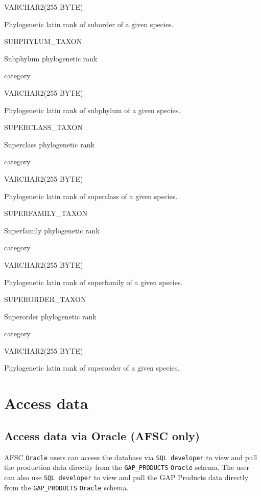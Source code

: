 \documentclass[
  letterpaper,
  oneside,
  open=any]{scrbook}
\begin{document}
VARCHAR2(255 BYTE)

Phylogenetic latin rank of suborder of a given species.

SUBPHYLUM\_TAXON

Subphylum phylogenetic rank

category

VARCHAR2(255 BYTE)

Phylogenetic latin rank of subphylum of a given species.

SUPERCLASS\_TAXON

Superclass phylogenetic rank

category

VARCHAR2(255 BYTE)

Phylogenetic latin rank of superclass of a given species.

SUPERFAMILY\_TAXON

Superfamily phylogenetic rank

category

VARCHAR2(255 BYTE)

Phylogenetic latin rank of superfamily of a given species.

SUPERORDER\_TAXON

Superorder phylogenetic rank

category

VARCHAR2(255 BYTE)

Phylogenetic latin rank of superorder of a given species.

\hypertarget{access-data}{%
\chapter{Access data}\label{access-data}}

\hypertarget{access-data-via-oracle-afsc-only}{%
\section*{Access data via Oracle (AFSC
only)}\label{access-data-via-oracle-afsc-only}}


AFSC \texttt{Oracle} users can access the database via
\texttt{SQL\ developer} to view and pull the production data directly
from the \texttt{GAP\_PRODUCTS} \texttt{Oracle} schema. The user can
also use \texttt{SQL\ developer} to view and pull the GAP Products data
directly from the \texttt{GAP\_PRODUCTS} \texttt{Oracle} schema.
\end{document}
